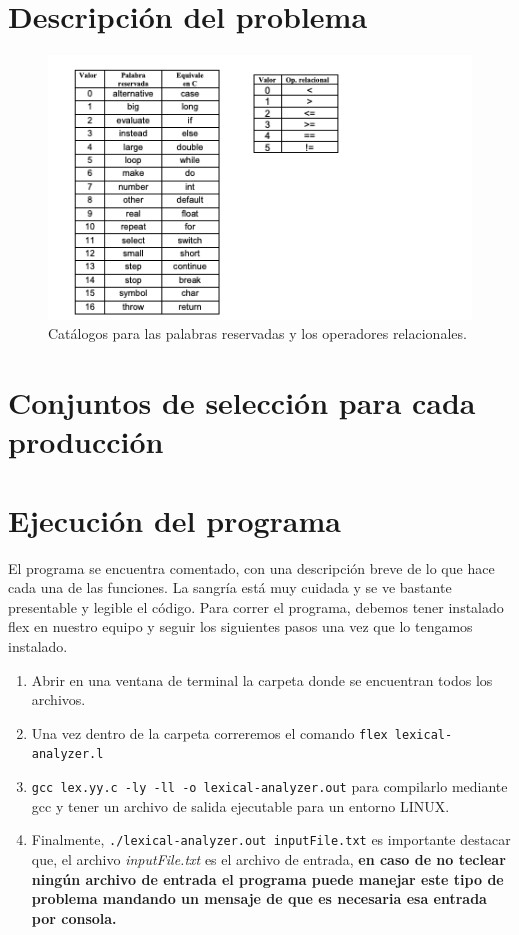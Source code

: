 \documentclass[12pt, a4paper]{article}
\begin{document}
\newpage

\section{Descripción del problema}


\begin{figure}[htpb!]
\centering
  \includegraphics[width=\textwidth]{catalogos.png}
\caption{Catálogos para las palabras reservadas y los operadores relacionales.}
\end{figure}\par


\section{Conjuntos de selección para cada producción}

\section{Ejecución del programa}
El programa se encuentra comentado, con una descripción breve de lo que hace cada una de las funciones. La sangría está muy cuidada y se ve bastante presentable y legible el código.
Para correr el programa, debemos tener instalado flex en nuestro equipo y seguir los siguientes pasos una vez que lo tengamos instalado.

\begin{enumerate}
    \item Abrir en una ventana de terminal la carpeta donde se encuentran todos los archivos.
    \item Una vez dentro de la carpeta correremos el comando \texttt{flex lexical-analyzer.l}
    \item \texttt{gcc lex.yy.c -ly -ll -o lexical-analyzer.out} para compilarlo mediante gcc y tener un archivo de salida ejecutable para un entorno LINUX.
    \item Finalmente, \texttt{./lexical-analyzer.out inputFile.txt} es importante destacar que, el archivo \textit{inputFile.txt} es el archivo de entrada, \textbf{en caso de no teclear ningún archivo de entrada el programa puede manejar este tipo de problema mandando un mensaje de que es necesaria esa entrada por consola.}
\end{enumerate}
\end{document}
